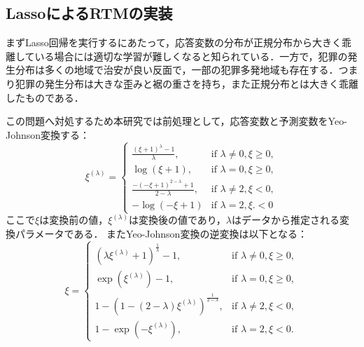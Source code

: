 \subsection{LassoによるRTMの実装}
まずLasso回帰を実行するにあたって，応答変数の分布が正規分布から大きく乖離している場合には適切な学習が難しくなると知られている\cite{islp, esl}．一方で，犯罪の発生分布は多くの地域で治安が良い反面で，一部の犯罪多発地域も存在する．つまり犯罪の発生分布は大きな歪みと裾の重さを持ち，また正規分布とは大きく乖離したものである．
%
\newcommand{\yj}[1]{{#1}^{(\lambda)}}
\newcommand{\yjv}{\xi}

この問題へ対処するため本研究では前処理として，応答変数と予測変数をYeo-Johnson変換\cite{weisberg2001yeo}する：
\begin{equation*}\label{yeo}
  \yj{\yjv} =
   \begin{cases} 
   \frac{(\yjv+1)^\lambda - 1}{\lambda}, & \text{if } \lambda \neq 0, \yjv \geq 0,  \\ 
   \log(\yjv+1), & \text{if } \lambda = 0, \yjv \geq 0,   \\ 
   \frac{-(-\yjv+1)^{2-\lambda} + 1}{2-\lambda}, & \text{if } \lambda \neq 2, \yjv < 0,  \\ 
   -\log(-\yjv+1) & \text{if } \lambda = 2, \yjv. < 0
   \end{cases}
\end{equation*}
ここで$\yjv$は変換前の値，$\yj{\yjv}$は変換後の値であり，$\lambda$はデータから推定される変換パラメータである．
またYeo-Johnson変換の逆変換は以下となる：
\begin{equation*}\label{yeo}
  \yjv =
  \begin{cases} 
    (\lambda\yj{\yjv}+1)^{\frac{1}{\lambda}}-1, & \text{if } \lambda \neq 0, \yjv \geq 0,  \\ 
  \exp(\yj{\yjv})-1, & \text{if } \lambda = 0, \yjv \geq 0,   \\ 
  1-(1-(2-\lambda)\yj{\yjv})^{\frac{1}{2-\lambda}}, & \text{if } \lambda \neq 2, \yjv < 0,  \\ 
  1-\exp(-\yj{\yjv}), & \text{if } \lambda = 2,  \yjv < 0.
  \end{cases}
\end{equation*}

